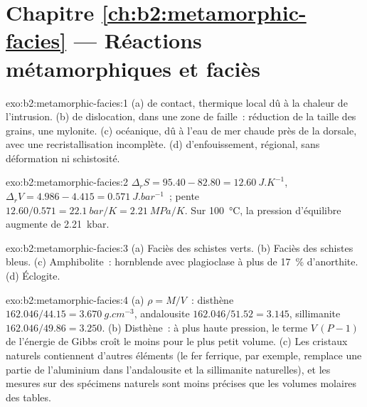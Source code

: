 \section*{Chapitre \ref{ch:b2:metamorphic-facies} --- Réactions métamorphiques et faciès}

\begin{solution}{exo:b2:metamorphic-facies:1}
(a)  de contact,  thermique local dû à la chaleur de l'intrusion.
(b)  de dislocation, dans une zone de faille~: réduction de la taille des grains, une mylonite.
(c)  océanique, dû à l'eau de mer chaude près de la dorsale, avec une
recristallisation incomplète. (d)  d'enfouissement, régional, sans déformation ni
schistosité.
\end{solution}

\begin{solution}{exo:b2:metamorphic-facies:2}
$\Delta_r S = 95.40 - 82.80 = \qty{12.60}{J.K^{-1}}$, $\Delta_r V = 4.986 - 4.415 =
\qty{0.571}{J.bar^{-1}}$~; pente $12.60/0.571 = \qty{22.1}{bar/K} = \qty{2.21}{MPa/K}$.
Sur \qty{100}{\celsius}, la pression d'équilibre augmente de \qty{2.21}{kbar}.
\end{solution}

\begin{solution}{exo:b2:metamorphic-facies:3}
(a) Faciès des schistes verts. (b) Faciès des schistes bleus. (c) Amphibolite~: hornblende avec plagioclase à plus de
\qty{17}{\percent} d'anorthite. (d) Éclogite.
\end{solution}

\begin{solution}{exo:b2:metamorphic-facies:4}
(a) $\rho = M/V$~: disthène $162.046/44.15 = \qty{3.670}{g.cm^{-3}}$, andalousite
$162.046/51.52 = 3.145$, sillimanite $162.046/49.86 = 3.250$. (b) Disthène~: à plus haute
pression, le terme $V\,(P - 1)$ de l'énergie de Gibbs croît le moins pour le plus petit volume.
(c) Les cristaux naturels contiennent d'autres éléments (le fer ferrique, par exemple, remplace une partie de
l'aluminium dans l'andalousite et la sillimanite naturelles), et les mesures sur des spécimens naturels sont
moins précises que les volumes molaires des tables.
\end{solution}

